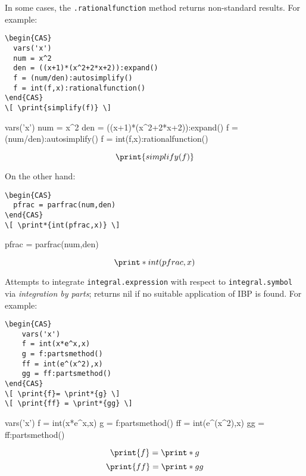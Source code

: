 In some cases, the \texttt{.rationalfunction} method returns non-standard results. For example:
\begin{codebox}
    \begin{verbatim}
\begin{CAS}
  vars('x')
  num = x^2
  den = ((x+1)*(x^2+2*x+2)):expand()
  f = (num/den):autosimplify()
  f = int(f,x):rationalfunction()
\end{CAS}
\[ \print{simplify(f)} \] 
\end{verbatim}
\tcblower
\begin{CAS}
  vars('x')
  num = x^2
  den = ((x+1)*(x^2+2*x+2)):expand()
  f = (num/den):autosimplify()
  f = int(f,x):rationalfunction()
\end{CAS}
\[ \print{simplify(f)} \] 
\end{codebox}
On the other hand:
\begin{codebox}
    \begin{verbatim}
\begin{CAS}
  pfrac = parfrac(num,den)
\end{CAS}
\[ \print*{int(pfrac,x)} \] 
\end{verbatim}
\tcblower
\begin{CAS}
    pfrac = parfrac(num,den)
  \end{CAS}
\[ \print*{int(pfrac,x)} \] 
\end{codebox}


Attempts to integrate \texttt{integral.expression} with respect to \texttt{integral.symbol} via \emph{integration by parts}; returns nil if no suitable application of IBP is found. For example:

\begin{codebox}
    \begin{verbatim}
\begin{CAS}
    vars('x')
    f = int(x*e^x,x)
    g = f:partsmethod()
    ff = int(e^(x^2),x)
    gg = ff:partsmethod()
\end{CAS}
\[ \print{f}= \print*{g} \] 
\[ \print{ff} = \print*{gg} \]
\end{verbatim}
\tcblower
\begin{CAS}
    vars('x')
    f = int(x*e^x,x)
    g = f:partsmethod()
    ff = int(e^(x^2),x)
    gg = ff:partsmethod()
\end{CAS}
\[ \print{f}= \print*{g} \] 
\[ \print{ff} = \print*{gg} \] 
\end{codebox}


